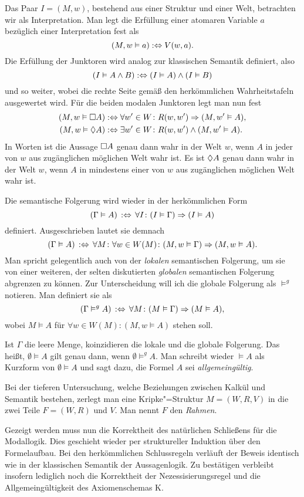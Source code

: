 Das Paar $I=(M,w)$, bestehend aus einer Struktur und einer Welt, betrachten
wir als Interpretation. Man legt die Erfüllung einer atomaren Variable
$a$ bezüglich einer Interpretation fest als%
\[(M,w\vDash a) :\Leftrightarrow V(w,a).\]
Die Erfüllung der Junktoren wird analog zur klassischen Semantik
definiert, also%
\[(I\vDash A\land B) :\Leftrightarrow (I\vDash A)\land (I\vDash B)\]
und so weiter, wobei die rechte Seite gemäß den herkömmlichen
Wahrheitstafeln ausgewertet wird. Für die beiden modalen Junktoren legt
man nun fest%
\begin{align*}
(M,w\vDash\Box A) &:\Leftrightarrow\forall w'\in W\colon R(w,w')\Rightarrow (M,w'\vDash A),\\
(M,w\vDash\Diamond A) &:\Leftrightarrow\exists w'\in W\colon R(w,w')\land (M,w'\vDash A). 
\end{align*}
In Worten ist die Aussage $\Box A$ genau dann wahr in der Welt $w$, wenn
$A$ in jeder von $w$ aus zugänglichen möglichen Welt wahr ist.
Es ist $\Diamond A$ genau dann wahr in der Welt $w$, wenn $A$ in mindestens einer
von $w$ aus zugänglichen möglichen Welt wahr ist.

Die semantische Folgerung wird wieder in der herkömmlichen Form%
\[(\Gamma\vDash A)\,:\Leftrightarrow\,\forall I\colon (I\vDash\Gamma)\Rightarrow (I\vDash A)\]
definiert. Ausgeschrieben lautet sie demnach
\[(\Gamma\vDash A)\,:\Leftrightarrow\,\forall M\colon\forall w\in W(M)\colon
(M,w\vDash\Gamma)\Rightarrow (M,w\vDash A).\]
Man spricht gelegentlich auch von der \emph{lokalen} semantischen Folgerung,
um sie von einer weiteren, der selten diskutierten \emph{globalen} semantischen
Folgerung abgrenzen zu können. Zur Unterscheidung will ich die globale
Folgerung als $\models^g$ notieren. Man definiert sie als%
\[(\Gamma\vDash^g A)\,:\Leftrightarrow\,\forall M\colon (M\vDash\Gamma)\Rightarrow (M\vDash A),\]
wobei $M\models A$ für $\forall w\in W(M)\colon (M,w\models A)$ stehen soll.

Ist $\Gamma$ die leere Menge, koinzidieren die lokale und die globale
Folgerung. Das heißt, $\emptyset\models A$ gilt genau dann, wenn
$\emptyset\models^g A$. Man schreibt wieder $\models A$ als Kurzform
von $\emptyset\models A$ und sagt dazu, die Formel $A$ sei
\emph{allgemeingültig}.

Bei der tieferen Untersuchung, welche Beziehungen zwischen Kalkül und
Semantik bestehen, zerlegt man eine Kripke"=Struktur $M=(W,R,V)$ in
die zwei Teile $F=(W,R)$ und $V$. Man nennt $F$ den \emph{Rahmen}.

Gezeigt werden muss nun die Korrektheit des natürlichen Schließens
für die Modallogik. Dies geschieht wieder per struktureller Induktion
über den Formelaufbau. Bei den herkömmlichen Schlussregeln verläuft der
Beweis identisch wie in der klassischen Semantik der Aussagenlogik.
Zu bestätigen verbleibt insofern lediglich noch die Korrektheit der
Nezessisierungsregel und die Allgemeingültigkeit des Axiomenschemas K.

